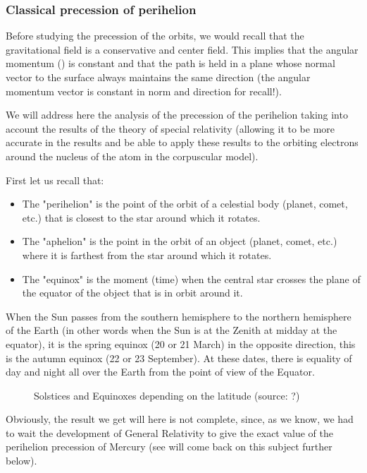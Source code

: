 	\subsubsection{Classical precession of perihelion}\label{classical precession of perihelion}
	Before studying the precession of the orbits, we would recall that the gravitational field is a conservative and center field. This implies that the angular momentum () is constant and that the path is held in a plane whose normal vector to the surface always maintains the same direction (the angular momentum vector is constant in norm and direction for recall!).

	We will address here the analysis of the precession of the perihelion taking into account the results of the theory of special relativity (allowing it to be more accurate in the results and be able to apply these results to the orbiting electrons around the nucleus of the atom in the corpuscular model).
	
	First let us recall that:
	\begin{itemize}
		\item The "perihelion" is the point of the orbit of a celestial body (planet, comet, etc.) that is closest to the star around which it rotates.

		\item The "aphelion" is the point in the orbit of an object (planet, comet, etc.) where it is farthest from the star around which it rotates.

		\item The "equinox" is the moment (time) when the central star crosses the plane of the equator of the object that is in orbit around it.
	\end{itemize}
	\begin{tcolorbox}[title=Remark,colframe=black,arc=10pt]
	When the Sun passes from the southern hemisphere to the northern hemisphere of the Earth (in other words when the Sun is at the Zenith at midday at the equator), it is the spring equinox (20 or 21 March) in the opposite direction, this is the autumn equinox (22 or 23 September). At these dates, there is equality of day and night all over the Earth from the point of view of the Equator.
	\begin{figure}[H]
		\centering
		\caption[Solstices and Equinoxes depending on the latitude]{Solstices and Equinoxes depending on the latitude (source: ?)}
	\end{figure}
	\end{tcolorbox}
	Obviously, the result we get will here is not complete, since, as we know, we had to wait the development of General Relativity to give the exact value of the perihelion  precession of Mercury (see will come back on this subject further below).

